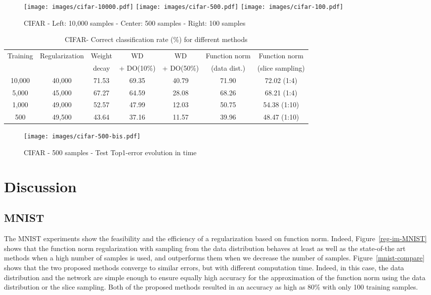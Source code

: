 \documentclass{article}
\begin{document}
\begin{figure}[ht!]
\texttt{[image: images/cifar-10000.pdf]} \hfill 
\texttt{[image: images/cifar-500.pdf]} \hfill
\texttt{[image: images/cifar-100.pdf]}
\caption{CIFAR - Left: 10,000 samples - Center: 500 samples - Right: 100 samples}
\label{reg-im-CIFAR}
\end{figure}
\begin{table}[ht!]
\centering
\begin{tabular}{|c|c||c|c|c|c|c|}
\hline
Training & Regularization & Weight & WD &WD & Function norm  & Function norm\\
& & decay &  + DO(10\%)& + DO(50\%)  &(data dist.)&(slice sampling)\\
\hline
\hline
10,000 & 40,000 & 71.53 & 69.35 & 40.79 & 71.90&  72.02 (1:4)\\
5,000 & 45,000 & 67.27 & 64.59 & 28.08 & 68.26 & 68.21 (1:4)\\
1,000 & 49,000 & 52.57 & 47.99& 12.03 & 50.75 & 54.38 (1:10)\\
500 & 49,500 & 43.64 & 37.16 & 11.57 & 39.96 & 48.47 (1:10)\\
\hline
\end{tabular}
\caption{CIFAR- Correct classification rate (\%) for different methods}
\label{cifar-correct}
\end{table}

\begin{wrapfigure}{R}{7cm}
\centering
\texttt{[image: images/cifar-500-bis.pdf]}
\caption{CIFAR - 500 samples - Test Top1-error evolution in time}
\label{cifar500}
\end{wrapfigure}


\section{Discussion}
\label{discussion}
\subsection{MNIST}
The MNIST experiments show the feasibility and the efficiency of a regularization based on function norm. Indeed, Figure~\ref{reg-im-MNIST} shows that the function norm regularization with sampling from the data distribution behaves at least as well as the state-of-the art methods when a high number of samples is used, and outperforms them when we decrease the number of samples. Figure~\ref{mnist-compare} shows that the two proposed methods converge to similar errors, but with different computation time. Indeed, in this case, the data distribution and the network are simple enough to ensure equally high accuracy for the approximation of the function norm using the data distribution or the slice sampling.  Both of the proposed methods resulted in an accuracy as high as 80\% with only 100 training samples.
\end{document}
